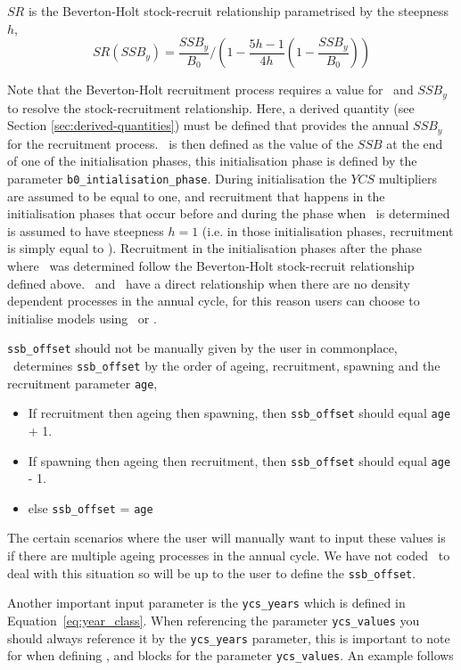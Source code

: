 $SR$ is the Beverton-Holt stock-recruit relationship parametrised by the steepness $h$,
\begin{equation}\label{eq:BH_SR}
SR(SSB_y) = \frac{SSB_y}{B_0} / \left( 1-\frac{5h-1}{4h} \left( 1-\frac{SSB_y}{B_0} \right) \right)
\end{equation}

Note that the Beverton-Holt recruitment process requires a value for \Bzero\ and $SSB_y$ to resolve the stock-recruitment relationship. Here, a derived quantity (see Section \ref{sec:derived-quantities}) must be defined that provides the annual $SSB_y$ for the recruitment process. \Bzero\ is then defined as the value of the $SSB$ at the end of one of the initialisation phases, this initialisation phase is defined by the parameter \texttt{b0\_intialisation\_phase}. During initialisation the $YCS$ multipliers are assumed to be equal to one, and recruitment that happens in the initialisation phases that occur before and during the phase when \Bzero\ is determined is assumed to have steepness $h=1$ (i.e. in those initialisation phases, recruitment is simply equal to \Rzero). Recruitment in the initialisation phases after the phase where \Bzero\ was determined follow the Beverton-Holt stock-recruit relationship defined above. \Rzero\ and \Bzero\ have a direct relationship when there are no density dependent processes in the annual cycle, for this reason users can choose to initialise models using \Bzero\ or \Rzero.

\texttt{ssb\_offset} should not be manually given by the user in commonplace, \CNAME\ determines \texttt{ssb\_offset} by the order of ageing, recruitment, spawning and the recruitment parameter \texttt{age}, 
\begin{itemize}
	\item If recruitment then ageing then spawning, then \texttt{ssb\_offset} should equal \texttt{age} + 1.
	\item If spawning then ageing then recruitment, then \texttt{ssb\_offset} should equal \texttt{age} - 1.
	\item else \texttt{ssb\_offset} = \texttt{age}
\end{itemize}

The certain scenarios where the user will manually want to input these values is if there are multiple ageing processes in the annual cycle. We have not coded \CNAME\ to deal with this situation so will be up to the user to define the \texttt{ssb\_offset}.

Another important input parameter is the \texttt{ycs\_years} which is defined in Equation~\eqref{eq:year_class}. When referencing the parameter \texttt{ycs\_values} you should always reference it by the \texttt{ycs\_years} parameter, this is important to note for when defining ,  and  blocks for the parameter \texttt{ycs\_values}. An example follows

